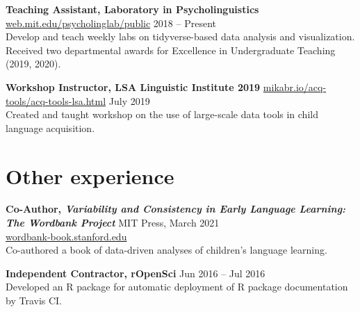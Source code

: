 \documentclass[11pt,]{article}
\newcommand{\project}[4]{
  \textbf{#1} \hspace{4pt} \small \href{http://#2}{#2} \normalsize \hfill #3\\ \hangindent=15pt #4
}
\begin{document}
\project{Teaching Assistant, Laboratory in Psycholinguistics}{web.mit.edu/psycholinglab/public}{2018 -- Present}{Develop and teach weekly labs on tidyverse-based data analysis and visualization.\\Received two departmental awards for Excellence in Undergraduate Teaching (2019, 2020).}

\project{Workshop Instructor, LSA Linguistic Institute 2019}{mikabr.io/acq-tools/acq-tools-lsa.html}{July 2019}{Created and taught workshop on the use of large-scale data tools in child language acquisition.}

\hypertarget{other-experience}{%
\section{\texorpdfstring{\faArchive \hspace{2pt} Other
experience}{ Other experience}}\label{other-experience}}

\project{Co-Author, \em{Variability and Consistency in Early Language Learning:
The Wordbank Project}}{}{MIT Press, March 2021}{\small \href{http://wordbank-book.stanford.edu}{wordbank-book.stanford.edu} \normalsize\\Co-authored a book of data-driven analyses of children's language learning.}

\project{Independent Contractor, rOpenSci}{}{Jun 2016 -- Jul 2016}{Developed an R package for automatic deployment of R package documentation by Travis CI.}
\end{document}
